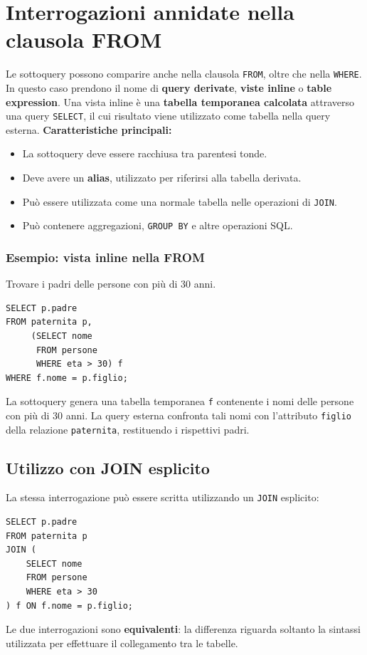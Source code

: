 \section{Interrogazioni annidate nella clausola FROM}
Le sottoquery possono comparire anche nella clausola \texttt{FROM},
oltre che nella \texttt{WHERE}.
In questo caso prendono il nome di \textbf{query derivate},
\textbf{viste inline} o \textbf{table expression}.
Una vista inline è una \textbf{tabella temporanea calcolata}
attraverso una query \texttt{SELECT}, il cui risultato viene
utilizzato come tabella nella query esterna.
\textbf{Caratteristiche principali:}
\begin{itemize}
    \item La sottoquery deve essere racchiusa tra parentesi tonde.
    \item Deve avere un \textbf{alias}, utilizzato per riferirsi
    alla tabella derivata.
    \item Può essere utilizzata come una normale tabella
    nelle operazioni di \texttt{JOIN}.
    \item Può contenere aggregazioni, \texttt{GROUP BY}
    e altre operazioni SQL.
\end{itemize}
\subsubsection*{Esempio: vista inline nella FROM}
Trovare i padri delle persone con più di 30 anni.
\begin{verbatim}
SELECT p.padre
FROM paternita p,
     (SELECT nome
      FROM persone
      WHERE eta > 30) f
WHERE f.nome = p.figlio;
\end{verbatim}
La sottoquery genera una tabella temporanea \texttt{f}
contenente i nomi delle persone con più di 30 anni.
La query esterna confronta tali nomi con l'attributo
\texttt{figlio} della relazione \texttt{paternita},
restituendo i rispettivi padri.
\subsection{Utilizzo con JOIN esplicito}
La stessa interrogazione può essere scritta utilizzando
un \texttt{JOIN} esplicito:
\begin{verbatim}
SELECT p.padre
FROM paternita p
JOIN (
    SELECT nome
    FROM persone
    WHERE eta > 30
) f ON f.nome = p.figlio;
\end{verbatim}
Le due interrogazioni sono \textbf{equivalenti}:
la differenza riguarda soltanto la sintassi utilizzata
per effettuare il collegamento tra le tabelle.
